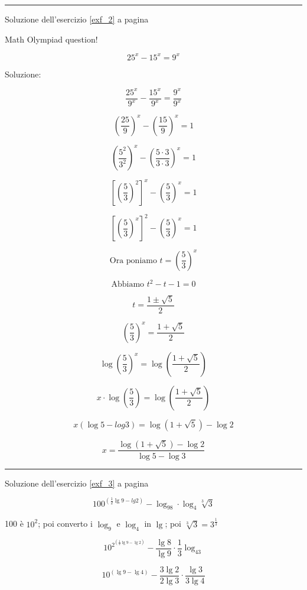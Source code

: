\vspace{1cm}
\hrule
\vspace{1cm}


Soluzione dell'esercizio \ref{exf_2} a pagina \pageref{exf_2}\label{solf_2}

Math Olympiad question!

\[
25^x-15^x=9^x
\]

Soluzione:

\[
\frac{25^x}{9^x}-
\frac{15^x}{9^x}=
\frac{9^x}{9^x}
\]

\[
\left(
\frac{25}{9}
\right)^x
-
\left(
\frac{15}{9}
\right)^x
=1
\]

\[
\left( \frac{ 5^2}{ 3^2} \right)^x
-
\left(
\frac{5\cdot 3}
{3\cdot 3} 
\right)^x=1
\]

\[
\left[ \left( \frac{5}{3} \right)^2 \right]^x
-
\left(
\frac{5}
{3} 
\right)^x=1
\]

\[
\left[ \left( \frac{5}{3} \right)^x \right]^2
-
\left(
\frac{5}
{3} 
\right)^x=1
\]


\[
\textrm{Ora poniamo } t=\left( \frac{5}{3} \right)^x
\]


\[
\textrm{Abbiamo } t^2-t-1=0
\]

\[
t=\frac{ 1\pm \sqrt{5} }{2 }
\]

\[
\left( \frac{5}{3} \right)^x=\frac{ 1+ \sqrt{5} }{2 }
\]

\[
\log\left( \frac{5}{3} \right)^x=\log\left(\frac{ 1+ \sqrt{5} }{2 }\right)
\]

\[
x\cdot \log\left( \frac{5}{3} \right)=\log\left(\frac{ 1+ \sqrt{5} }{2 }\right)
\]

\[
x(\log5-log3)=\log(1+\sqrt 5)-\log2
\]

\[
x=\frac
{\log(1+\sqrt 5)-\log2}
{\log5-\log3}
\]


\vspace{1cm}
\hrule
\vspace{1cm}



Soluzione dell'esercizio \ref{exf_3} a pagina \pageref{exf_3}\label{solf_3}

\[
100^{\left(\frac{1}{2}\lg9-lg2\right)}-\log_98\cdot\log_4\sqrt[3]{3}
\]

100 è $10^2$; poi converto i $\log_9$ e $\log_4$ in $\lg$; poi $\sqrt[3]{3}=3^{\frac{1}{3}}$

\[
10^{2^{\left(\frac{1}{2}\lg9-\lg2\right)}}-\frac{\lg8}{\lg9}\cdot\frac{1}{3}\log_43
\]

\[
10^{\left(\lg9-\lg4\right)}-\frac{3\lg2}{2\lg3}\cdot\frac{\lg3}{3\lg4}
\]


